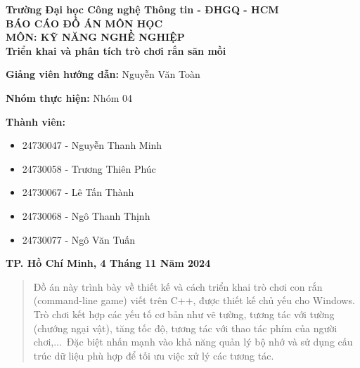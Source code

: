 \documentclass[12pt]{report}
\begin{document}
\begin{titlepage}
    \begin{center}
        {\Large\textbf{Trường Đại học Công nghệ Thông tin - ĐHGQ - HCM}}\\[0.5cm]
        
        \textbf{\Huge BÁO CÁO ĐỒ ÁN MÔN HỌC}\\[0.5cm]
        {\Large\textbf{MÔN: KỸ NĂNG NGHỀ NGHIỆP}}\\[2cm]
        
        {\LARGE\textbf{Triển khai và phân tích trò chơi rắn săn mồi}}\\[1.5cm]

        \begin{flushleft}
            \large
            \textbf{Giảng viên hướng dẫn: }
            Nguyễn Văn Toàn
        \end{flushleft}
        
        \begin{flushleft}
            \large
            \textbf{Nhóm thực hiện:} Nhóm 04
        \end{flushleft}
        
        \begin{flushleft}
            \large
            \textbf{Thành viên:}
            \begin{itemize}
                \item 24730047 - Nguyễn Thanh Minh
                \item 24730058 - Trương Thiên Phúc
                \item 24730067 - Lê Tấn Thành
                \item 24730068 - Ngô Thanh Thịnh
                \item 24730077 - Ngô Văn Tuấn
            \end{itemize}
        \end{flushleft}
        
        
        \vfill
        
        {\Large\textbf{TP. Hồ Chí Minh, 4 Tháng 11 Năm 2024}}
        
    \end{center}
\end{titlepage}

\begin{abstract}
    Đồ án này trình bày về thiết kế và cách triển khai trò chơi con rắn (command-line game) viết trên C++, được thiết kế chủ yếu cho Windows. Trò chơi kết hợp các yếu tố cơ bản như vẽ tường, tương tác với tường (chướng ngại vật), tăng tốc độ, tương tác với thao tác phím của người chơi,...\
    Đặc biệt nhấn mạnh vào khả năng quản lý bộ nhớ và sử dụng cấu trúc dữ liệu phù hợp để tối ưu việc xử lý các tương tác.
\end{abstract}
\end{document}
